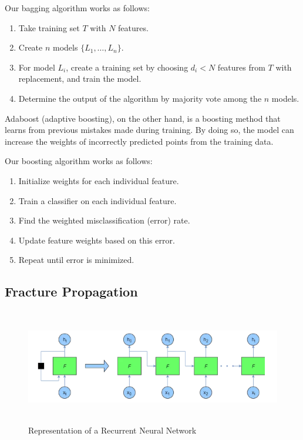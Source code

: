 Our bagging algorithm works as follows:

\begin{enumerate}
\item Take training set $T$ with $N$ features.
\item Create $n$ models $\{L_1,\dots,L_n\}$.
\item For model $L_i$, create a training set by choosing $d_i<N$ features from $T$ with replacement, and train the model.
\item Determine the output of the algorithm by majority vote among the $n$ models.
\end{enumerate}

Adaboost (adaptive boosting), on the other hand, is a boosting method that learns from previous mistakes made during training. By doing so, the model can increase the weights of incorrectly predicted points from the training data.

Our boosting algorithm works as follows:

\begin{enumerate}
    \item Initialize weights for each individual feature.
    \item Train a classifier on each individual feature.
    \item Find the weighted misclassification (error) rate.
    \item Update feature weights based on this error.
    \item Repeat until error is minimized.
\end{enumerate}


\subsection{Fracture Propagation}

\begin{figure}[!b]
    \centering
    \noindent
\includegraphics[width=12cm , height = 5cm]{images/rnn.PNG}
    \caption{Representation of a Recurrent Neural Network}
    \label{fig:rnn}
\end{figure}

